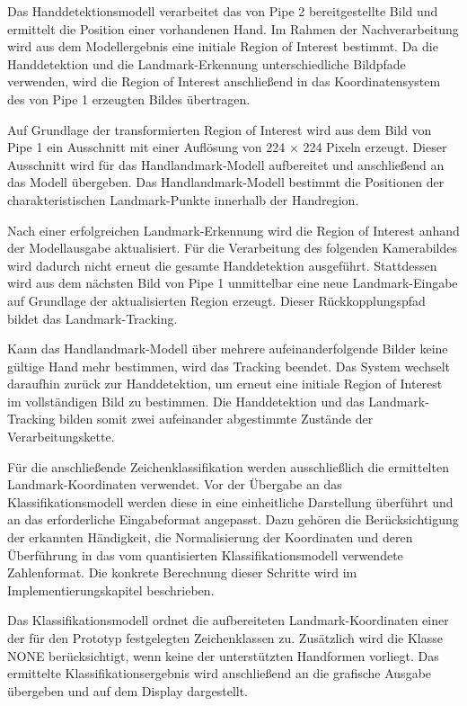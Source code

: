 Das Handdetektionsmodell verarbeitet das von Pipe 2 bereitgestellte Bild und ermittelt die Position einer vorhandenen Hand. Im Rahmen der Nachverarbeitung wird aus dem Modellergebnis eine initiale Region of Interest bestimmt. Da die Handdetektion und die Landmark-Erkennung unterschiedliche Bildpfade verwenden, wird die Region of Interest anschließend in das Koordinatensystem des von Pipe 1 erzeugten Bildes übertragen.

Auf Grundlage der transformierten Region of Interest wird aus dem Bild von Pipe 1 ein Ausschnitt mit einer Auflösung von 224 × 224 Pixeln erzeugt. Dieser Ausschnitt wird für das Handlandmark-Modell aufbereitet und anschließend an das Modell übergeben. Das Handlandmark-Modell bestimmt die Positionen der charakteristischen Landmark-Punkte innerhalb der Handregion.

Nach einer erfolgreichen Landmark-Erkennung wird die Region of Interest anhand der Modellausgabe aktualisiert. Für die Verarbeitung des folgenden Kamerabildes wird dadurch nicht erneut die gesamte Handdetektion ausgeführt. Stattdessen wird aus dem nächsten Bild von Pipe 1 unmittelbar eine neue Landmark-Eingabe auf Grundlage der aktualisierten Region erzeugt. Dieser Rückkopplungspfad bildet das Landmark-Tracking.

Kann das Handlandmark-Modell über mehrere aufeinanderfolgende Bilder keine gültige Hand mehr bestimmen, wird das Tracking beendet. Das System wechselt daraufhin zurück zur Handdetektion, um erneut eine initiale Region of Interest im vollständigen Bild zu bestimmen. Die Handdetektion und das Landmark-Tracking bilden somit zwei aufeinander abgestimmte Zustände der Verarbeitungskette.

Für die anschließende Zeichenklassifikation werden ausschließlich die ermittelten Landmark-Koordinaten verwendet. Vor der Übergabe an das Klassifikationsmodell werden diese in eine einheitliche Darstellung überführt und an das erforderliche Eingabeformat angepasst. Dazu gehören die Berücksichtigung der erkannten Händigkeit, die Normalisierung der Koordinaten und deren Überführung in das vom quantisierten Klassifikationsmodell verwendete Zahlenformat. Die konkrete Berechnung dieser Schritte wird im Implementierungskapitel beschrieben.

Das Klassifikationsmodell ordnet die aufbereiteten Landmark-Koordinaten einer der für den Prototyp festgelegten Zeichenklassen zu. Zusätzlich wird die Klasse NONE berücksichtigt, wenn keine der unterstützten Handformen vorliegt. Das ermittelte Klassifikationsergebnis wird anschließend an die grafische Ausgabe übergeben und auf dem Display dargestellt.


